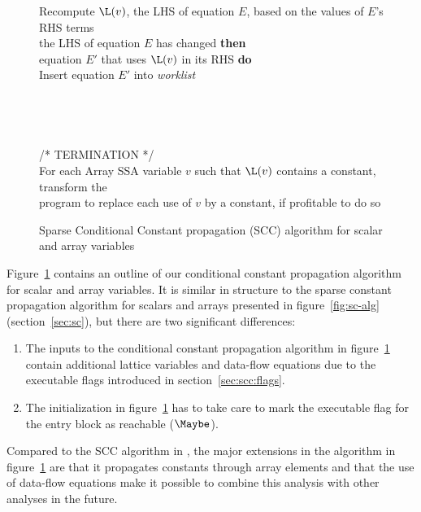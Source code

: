 \begin{figure}
\begin{center}
\begin{programa}
\Tb Recompute $\L(v)$, the LHS of equation $E$, based on the values of $E$'s RHS terms\\
 the LHS of equation $E$ has changed {\bf then}\\
 equation $E'$ that uses $\L(v)$ in its RHS {\bf do}\\
\Td Insert equation $E'$ into {\it worklist}\\
\\
\\
 \\
\\
/* TERMINATION */\\
\Ta For each Array SSA variable $v$ such that $\L(v)$ contains a constant, transform the \\ 
\Ta program to replace each use of $v$ by a constant, if profitable to do so
\end{programa}
\end{center}
\caption{Sparse Conditional Constant propagation (SCC) algorithm for scalar and array variables}
\label{fig:scc-alg}
\end{figure}

Figure~\ref{fig:scc-alg} contains an outline of our conditional constant
propagation algorithm for scalar and array variables.  It is similar in
structure to the sparse constant propagation algorithm for scalars
and arrays presented in figure~\ref{fig:sc-alg} (section~\ref{sec:sc}),
but there are two significant differences:
\begin{enumerate}
\item The inputs to the conditional constant propagation algorithm
in figure~\ref{fig:scc-alg}
contain additional lattice variables and data-flow equations due
to the executable flags introduced in section~\ref{sec:scc:flags}.
\item The initialization in figure~\ref{fig:scc-alg}
has to take care to mark the executable flag for the entry 
block as reachable ($\Maybe$).
\end{enumerate}
Compared to the SCC algorithm in \cite{WZ91}, the major extensions in
the algorithm in figure~\ref{fig:scc-alg} are that it propagates constants
through array elements and that the use of data-flow equations make
it possible to combine this analysis with other analyses in the future.


